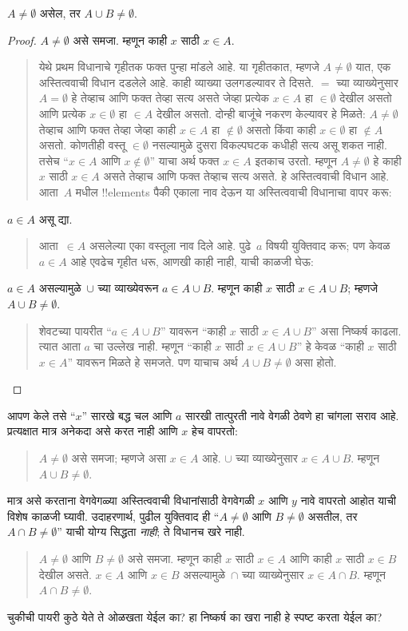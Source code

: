 \documentclass[../../../include/open-logic-section]{subfiles}
\begin{document}
\begin{prop}
$A \neq \emptyset$ असेल, तर $A \cup B \neq \emptyset$.
\end{prop}

\begin{proof}
$A \neq \emptyset$ असे समजा. म्हणून काही $x$ साठी $x \in A$.
\begin{quote}
येथे प्रथम विधानाचे गृहीतक फक्त पुन्हा मांडले आहे. या गृहीतकात, म्हणजे $A \neq \emptyset$ यात, एक अस्तित्ववाची विधान दडलेले आहे. काही व्याख्या उलगडल्यावर ते दिसते. $=$ च्या व्याख्येनुसार $A = \emptyset$ हे तेव्हाच आणि फक्त तेव्हा सत्य असते जेव्हा प्रत्येक $x \in A$ हा $\in \emptyset$ देखील असतो आणि प्रत्येक $x \in \emptyset$ हा $\in A$ देखील असतो. दोन्ही बाजूंचे नकरण केल्यावर हे मिळते: $A \neq \emptyset$ तेव्हाच आणि फक्त तेव्हा जेव्हा काही $x \in A$ हा $\notin \emptyset$ असतो किंवा काही $x \in \emptyset$ हा $\notin A$ असतो. कोणतीही वस्तू $\in \emptyset$ नसल्यामुळे दुसरा विकल्पघटक कधीही सत्य असू शकत नाही. तसेच “$x \in A$ आणि $x \notin \emptyset$” याचा अर्थ फक्त $x \in A$ इतकाच उरतो. म्हणून $A \neq \emptyset$ हे काही $x$ साठी $x \in A$ असते तेव्हाच आणि फक्त तेव्हाच सत्य असते. हे अस्तित्ववाची विधान आहे. आता~$A$ मधील !!{element}s पैकी एकाला नाव देऊन या अस्तित्ववाची विधानाचा वापर करू:
\end{quote}
$a \in A$ असू द्या.
\begin{quote}
आता~$\in A$ असलेल्या एका वस्तूला नाव दिले आहे. पुढे~$a$ विषयी युक्तिवाद करू; पण केवळ $a \in A$ आहे एवढेच गृहीत धरू, आणखी काही नाही, याची काळजी घेऊ:
\end{quote}
$a \in A$ असल्यामुळे~$\cup$ च्या व्याख्येवरून $a \in A \cup B$. म्हणून काही $x$ साठी $x \in A \cup B$; म्हणजे $A \cup B \neq \emptyset$.
\begin{quote}
शेवटच्या पायरीत “$a \in A \cup B$” यावरून “काही $x$ साठी $x \in A \cup B$” असा निष्कर्ष काढला. त्यात आता $a$ चा उल्लेख नाही. म्हणून “काही $x$ साठी $x \in A \cup B$” हे केवळ “काही $x$ साठी $x \in A$” यावरून मिळते हे समजते. पण याचाच अर्थ $A \cup B \neq \emptyset$ असा होतो.
\end{quote}
\end{proof}

आपण केले तसे “$x$” सारखे बद्ध चल आणि $a$ सारखी तात्पुरती नावे वेगळी ठेवणे हा चांगला सराव आहे. प्रत्यक्षात मात्र अनेकदा असे करत नाही आणि $x$ हेच वापरतो:
\begin{quote}
$A \neq \emptyset$ असे समजा; म्हणजे असा $x \in A$ आहे. $\cup$ च्या व्याख्येनुसार $x \in A \cup B$. म्हणून $A \cup B \neq \emptyset$.
\end{quote}
मात्र असे करताना वेगवेगळ्या अस्तित्ववाची विधानांसाठी वेगवेगळी $x$ आणि $y$ नावे वापरतो आहोत याची विशेष काळजी घ्यावी. उदाहरणार्थ, पुढील युक्तिवाद ही “$A \neq \emptyset$ आणि $B \neq \emptyset$ असतील, तर $A \cap B \neq \emptyset$” याची योग्य सिद्धता \emph{नाही}; ते विधानच खरे नाही.
\begin{quote}
$A \neq \emptyset$ आणि $B \neq \emptyset$ असे समजा. म्हणून काही $x$ साठी $x \in A$ आणि काही $x$ साठी $x \in B$ देखील असते. $x \in A$ आणि $x \in B$ असल्यामुळे~$\cap$ च्या व्याख्येनुसार $x \in A \cap B$. म्हणून $A \cap B \neq \emptyset$.
\end{quote}
चुकीची पायरी कुठे येते ते ओळखता येईल का? हा निष्कर्ष का खरा नाही हे स्पष्ट करता येईल का?
\end{document}
